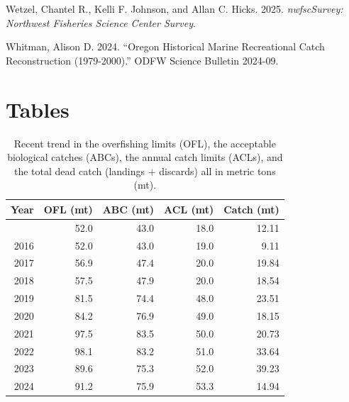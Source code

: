 \documentclass[
]{scrartcl}
\newlength{\cslhangindent}
\newenvironment{CSLReferences}[2] %
 {\begin{list}{}{%
  \setlength{\itemindent}{0pt}
  \setlength{\leftmargin}{0pt}
  \setlength{\parsep}{0pt}
  \ifodd #1
   \setlength{\leftmargin}{\cslhangindent}
   \setlength{\itemindent}{-1\cslhangindent}
  \fi
  \setlength{\itemsep}{#2\baselineskip}}}
 {\end{list}}
\begin{document}
\begin{CSLReferences}{1}{0}
Wetzel, Chantel R., Kelli F. Johnson, and Allan C. Hicks. 2025.
\emph{nwfscSurvey: Northwest Fisheries Science Center Survey}.

Whitman, Alison D. 2024. {``Oregon Historical Marine Recreational Catch
Reconstruction (1979-2000).''} ODFW Science Bulletin 2024-09.

\end{CSLReferences}

\newpage{}

\section{Tables}\label{tables}

\begingroup
\fontsize{9.0pt}{10.8pt}\selectfont

\begin{longtable}{rrrrr}

\caption{\label{tbl-yelloweye_management}Recent trend in the overfishing
limits (OFL), the acceptable biological catches (ABCs), the annual catch
limits (ACLs), and the total dead catch (landings + discards) all in
metric tons (mt).}

\tabularnewline

\toprule
Year & OFL (mt) & ABC (mt) & ACL (mt) & Catch (mt) \\ 
\midrule\addlinespace[2.5pt]
2015 & 52.0 & 43.0 & 18.0 & 12.11 \\ 
2016 & 52.0 & 43.0 & 19.0 & 9.11 \\ 
2017 & 56.9 & 47.4 & 20.0 & 19.84 \\ 
2018 & 57.5 & 47.9 & 20.0 & 18.54 \\ 
2019 & 81.5 & 74.4 & 48.0 & 23.51 \\ 
2020 & 84.2 & 76.9 & 49.0 & 18.15 \\ 
2021 & 97.5 & 83.5 & 50.0 & 20.73 \\ 
2022 & 98.1 & 83.2 & 51.0 & 33.64 \\ 
2023 & 89.6 & 75.3 & 52.0 & 39.23 \\ 
2024 & 91.2 & 75.9 & 53.3 & 14.94 \\ 
\bottomrule

\end{longtable}

\endgroup

\newpage{}
\end{document}
